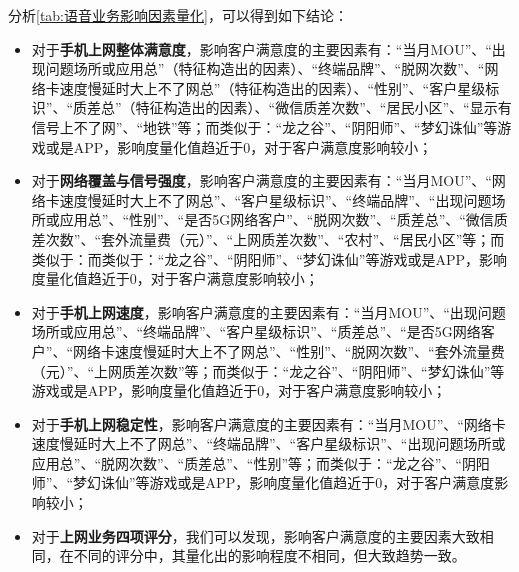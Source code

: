 \documentclass{MathorCupmodeling}
\begin{document}
	{\heiti 分析\textcolor{blue}{\cref{tab:语音业务影响因素量化}}，可以得到如下结论：}
	\begin{itemize}
		\item 对于\textbf{手机上网整体满意度}，影响客户满意度的主要因素有：“当月MOU”、“出现问题场所或应用总”（特征构造出的因素）、“终端品牌”、“脱网次数”、“网络卡速度慢延时大上不了网总”（特征构造出的因素）、“性别”、“客户星级标识”、“质差总”（特征构造出的因素）、“微信质差次数”、“居民小区”、“显示有信号上不了网”、“地铁”等；而类似于：“龙之谷”、“阴阳师”、“梦幻诛仙”等游戏或是APP，影响度量化值趋近于0，对于客户满意度影响较小；
		\item 对于\textbf{网络覆盖与信号强度}，影响客户满意度的主要因素有：“当月MOU”、“网络卡速度慢延时大上不了网总”、“客户星级标识”、“终端品牌”、“出现问题场所或应用总”、“性别”、“是否5G网络客户”、“脱网次数”、“质差总”、“微信质差次数”、“套外流量费（元）”、“上网质差次数”、“农村”、“居民小区”等；而类似于：而类似于：“龙之谷”、“阴阳师”、“梦幻诛仙”等游戏或是APP，影响度量化值趋近于0，对于客户满意度影响较小；
		\item 对于\textbf{手机上网速度}，影响客户满意度的主要因素有：“当月MOU”、“出现问题场所或应用总”、“终端品牌”、“客户星级标识”、“质差总”、“是否5G网络客户”、“网络卡速度慢延时大上不了网总”、“性别”、“脱网次数”、“套外流量费（元）”、“上网质差次数”等；而类似于：“龙之谷”、“阴阳师”、“梦幻诛仙”等游戏或是APP，影响度量化值趋近于0，对于客户满意度影响较小；
		\item 对于\textbf{手机上网稳定性}，影响客户满意度的主要因素有：“当月MOU”、“网络卡速度慢延时大上不了网总”、“终端品牌”、“客户星级标识”、“出现问题场所或应用总”、“脱网次数”、“质差总”、“性别”等；而类似于：“龙之谷”、“阴阳师”、“梦幻诛仙”等游戏或是APP，影响度量化值趋近于0，对于客户满意度影响较小；
		\item 对于\textbf{上网业务四项评分}，我们可以发现，影响客户满意度的主要因素大致相同，在不同的评分中，其量化出的影响程度不相同，但大致趋势一致。
	\end{itemize}
\end{document}
